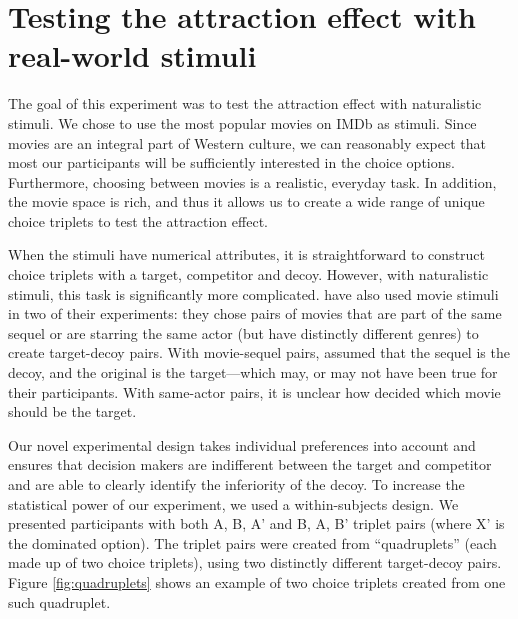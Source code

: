\documentclass[12pt, a4paper]{article}
\begin{document}
\section*{Testing the attraction effect with real-world stimuli}

The goal of this experiment was to test the attraction effect with naturalistic stimuli. We chose to use the most popular movies on IMDb as stimuli. Since movies are an integral part of Western culture, we can reasonably expect that most our participants will be sufficiently interested in the choice options. Furthermore, choosing between movies is a realistic, everyday task. In addition, the movie space is rich, and thus it allows us to create a wide range of unique choice triplets to test the attraction effect.

When the stimuli have numerical attributes, it is straightforward to construct choice triplets with a target, competitor and decoy. However, with naturalistic stimuli, this task is significantly more complicated.  have also used movie stimuli in two of their experiments: they chose pairs of movies that are part of the same sequel or are starring the same actor (but have distinctly different genres) to create target-decoy pairs. With movie-sequel pairs, \citeauthor{Frederick2014} assumed that the sequel is the decoy, and the original is the target---which may, or may not have been true for their participants. With same-actor pairs, it is unclear how \citeauthor{Frederick2014} decided which movie should be the target. 

Our novel experimental design takes individual preferences into account and ensures that decision makers are indifferent between the target and competitor and are able to clearly identify the inferiority of the decoy. To increase the statistical power of our experiment, we used a within-subjects design. We presented participants with both A, B, A' and B, A, B' triplet pairs (where X' is the dominated option). The triplet pairs were created from ``quadruplets'' (each made up of two choice triplets), using two distinctly different target-decoy pairs. Figure \ref{fig:quadruplets} shows an example of two choice triplets created from one such quadruplet.
\end{document}
